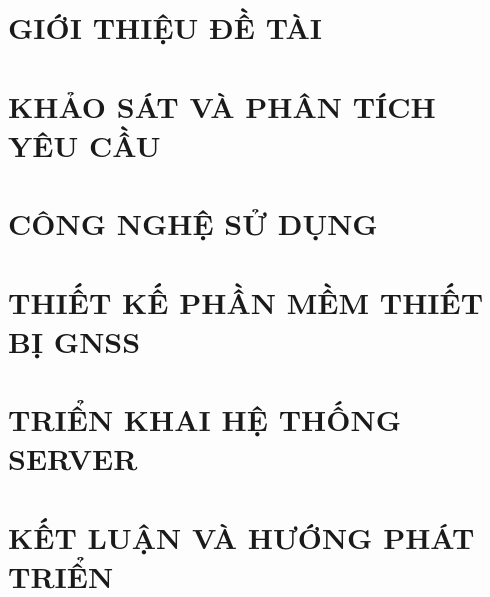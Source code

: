 \documentclass[a4paper,13pt,3p,twoside]{report}
\renewcommand{\bibname}{Danh_sach_tai_lieu_tham_khao}
\theoremstyle{definition}
\begin{document}
\glsaddall 
 \renewcommand*{\glossaryname}{Danh sách thuật ngữ}
\renewcommand*{\acronymname}{DANH MỤC THUẬT NGỮ VÀ TỪ VIẾT TẮT}
\renewcommand*{\entryname}{Thuật ngữ}
\renewcommand*{\descriptionname}{Ý nghĩa}
\printnoidxglossaries


% 


\newpage
{}

\pagestyle{fancy}
\fancyhf{}
\fancyhead[RE, LO]{\leftmark}
\fancyfoot[RE, LO]{\thepage}

\chapter{GIỚI THIỆU ĐỀ TÀI}
\label{chapter:Introduction}

\newpage
\chapter{KHẢO SÁT VÀ PHÂN TÍCH YÊU CẦU}
\label{chapter:Related_works}



\newpage
\chapter{CÔNG NGHỆ SỬ DỤNG}
\label{chapter:Methodology}


\newpage
\chapter{THIẾT KẾ PHẦN MỀM THIẾT BỊ GNSS}
\label{chapter:Experiment}


\newpage
\chapter{TRIỂN KHAI HỆ THỐNG SERVER}
\label{chapter:SolutionAndContribution}

\newpage
\chapter{KẾT LUẬN VÀ HƯỚNG PHÁT TRIỂN} %
\label{chapter:conclusion}




\newpage
\renewcommand\bibname{TÀI LIỆU THAM KHẢO}
\printbibliography
{}

\end{document}
